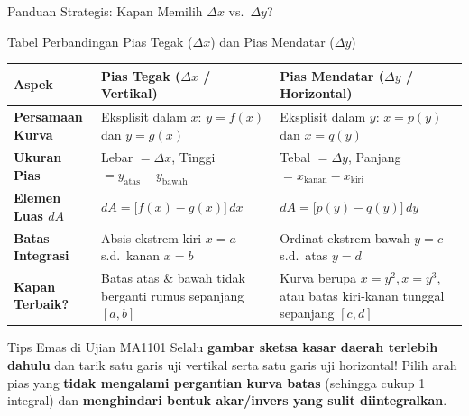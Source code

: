 \documentclass[aspectratio=43,10pt]{beamer}
\begin{document}
\begin{frame}{Panduan Strategis: Kapan Memilih $\Delta x$ vs.\ $\Delta y$?}
    \begin{block}{Tabel Perbandingan Pias Tegak ($\Delta x$) dan Pias Mendatar ($\Delta y$)}
        \scriptsize
        \renewcommand{\arraystretch}{1.45}
        \centering
        \begin{tabular}{@{}p{}p{}p{}@{}}
            \textbf{Aspek} & \textbf{Pias Tegak ($\Delta x$ / Vertikal)} & \textbf{Pias Mendatar ($\Delta y$ / Horizontal)}\\\hline
            \textbf{Persamaan Kurva} & Eksplisit dalam $x$: $y = f(x)$ dan $y = g(x)$ & Eksplisit dalam $y$: $x = p(y)$ dan $x = q(y)$\\
            \textbf{Ukuran Pias} & Lebar $= \Delta x$, Tinggi $= y_{\text{atas}} - y_{\text{bawah}}$ & Tebal $= \Delta y$, Panjang $= x_{\text{kanan}} - x_{\text{kiri}}$\\
            \textbf{Elemen Luas $dA$} & $dA = \big[f(x) - g(x)\big]\,dx$ & $dA = \big[p(y) - q(y)\big]\,dy$\\
            \textbf{Batas Integrasi} & Absis ekstrem kiri $x = a$ s.d.\ kanan $x = b$ & Ordinat ekstrem bawah $y = c$ s.d.\ atas $y = d$\\
            \textbf{Kapan Terbaik?} & Batas atas \& bawah tidak berganti rumus sepanjang $[a, b]$ & Kurva berupa $x = y^2, x = y^3$, atau batas kiri-kanan tunggal sepanjang $[c, d]$\\
        \end{tabular}
    \end{block}

    \begin{alertblock}{Tips Emas di Ujian MA1101}
        \scriptsize
        Selalu \textbf{gambar sketsa kasar daerah terlebih dahulu} dan tarik satu garis uji vertikal serta satu garis uji horizontal! Pilih arah pias yang \textbf{tidak mengalami pergantian kurva batas} (sehingga cukup 1 integral) dan \textbf{menghindari bentuk akar/invers yang sulit diintegralkan}.
    \end{alertblock}
\end{frame}
\end{document}
